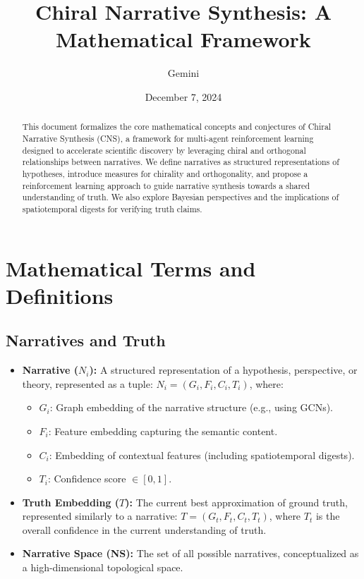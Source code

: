 \documentclass{article}
\title{Chiral Narrative Synthesis: A Mathematical Framework}
\author{Gemini}
\date{December 7, 2024}
\begin{document}
\maketitle

\begin{abstract}
This document formalizes the core mathematical concepts and conjectures of Chiral Narrative Synthesis (CNS), a framework for multi-agent reinforcement learning designed to accelerate scientific discovery by leveraging chiral and orthogonal relationships between narratives.  We define narratives as structured representations of hypotheses, introduce measures for chirality and orthogonality, and propose a reinforcement learning approach to guide narrative synthesis towards a shared understanding of truth.  We also explore Bayesian perspectives and the implications of spatiotemporal digests for verifying truth claims.
\end{abstract}


\section{Mathematical Terms and Definitions}

\subsection{Narratives and Truth}

\begin{itemize}
    \item \textbf{Narrative ($N_i$): } A structured representation of a hypothesis, perspective, or theory, represented as a tuple: $N_i = (G_i, F_i, C_i, T_i)$, where:
        \begin{itemize}
            \item $G_i$: Graph embedding of the narrative structure (e.g., using GCNs).
            \item $F_i$: Feature embedding capturing the semantic content.
            \item $C_i$: Embedding of contextual features (including spatiotemporal digests).
            \item $T_i$: Confidence score $\in [0, 1]$.
        \end{itemize}
    \item \textbf{Truth Embedding ($T$): }  The current best approximation of ground truth, represented similarly to a narrative: $T = (G_t, F_t, C_t, T_t)$, where $T_t$ is the overall confidence in the current understanding of truth.
    \item \textbf{Narrative Space (NS): } The set of all possible narratives, conceptualized as a high-dimensional topological space.
\end{itemize}
\end{document}
